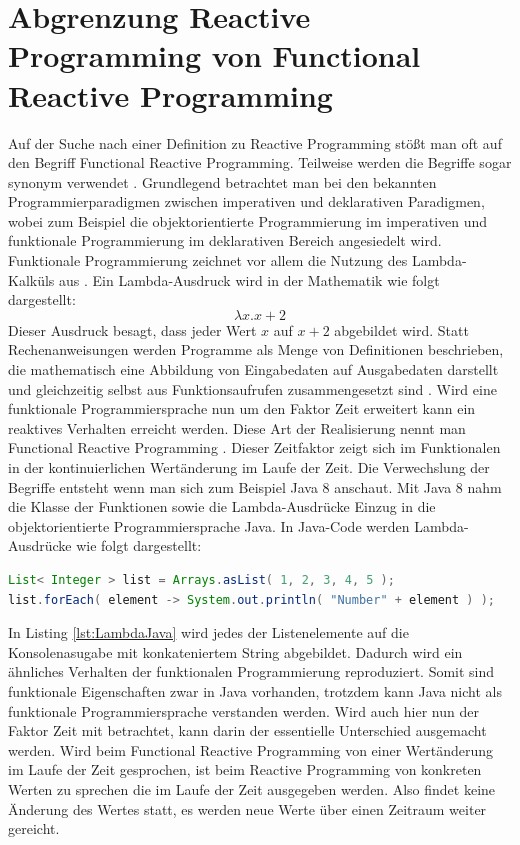 \section{Abgrenzung Reactive Programming von Functional Reactive Programming}
Auf der Suche nach einer Definition zu Reactive Programming stößt man oft auf den Begriff Functional Reactive Programming. Teilweise werden die Begriffe sogar synonym verwendet \cite{Nurkiewicz.2017}. Grundlegend betrachtet man bei den bekannten Programmierparadigmen zwischen imperativen und deklarativen Paradigmen, wobei zum Beispiel die objektorientierte Programmierung im imperativen und funktionale Programmierung im deklarativen Bereich angesiedelt wird. Funktionale Programmierung zeichnet vor allem die Nutzung des Lambda-Kalküls aus \cite{lamdakalk}. Ein Lambda-Ausdruck wird in der Mathematik wie folgt dargestellt:
\begin{displaymath}
\lambda x.x+2
\end{displaymath}
Dieser Ausdruck besagt, dass jeder Wert $x$ auf $x+2$ abgebildet wird.
Statt Rechenanweisungen werden Programme als Menge von Definitionen beschrieben, die mathematisch eine Abbildung von Eingabedaten auf Ausgabedaten darstellt und gleichzeitig selbst aus Funktionsaufrufen zusammengesetzt sind \cite{fpwiki}. Wird eine funktionale Programmiersprache nun um den Faktor Zeit erweitert kann ein reaktives Verhalten erreicht werden. Diese Art der Realisierung nennt man Functional Reactive Programming \cite{hsklwiki}. Dieser Zeitfaktor zeigt sich im Funktionalen in der kontinuierlichen Wertänderung im Laufe der Zeit. Die Verwechslung der Begriffe entsteht wenn man sich zum Beispiel Java 8 anschaut. Mit Java 8 nahm die Klasse der Funktionen sowie die Lambda-Ausdrücke Einzug in die objektorientierte Programmiersprache Java. In Java-Code werden Lambda-Ausdrücke wie folgt dargestellt:
\begin{lstlisting}[language=java, caption={Lambda Beispiel in Java}, float=hbt, label=lst:LambdaJava, frame=single]
List< Integer > list = Arrays.asList( 1, 2, 3, 4, 5 );
list.forEach( element -> System.out.println( "Number" + element ) );
\end{lstlisting}
In Listing \ref{lst:LambdaJava} wird jedes der Listenelemente auf die Konsolenasugabe mit konkateniertem String abgebildet. Dadurch wird ein ähnliches Verhalten der funktionalen Programmierung reproduziert. Somit sind funktionale Eigenschaften zwar in Java vorhanden, trotzdem kann Java nicht als funktionale Programmiersprache verstanden werden. Wird auch hier nun der Faktor Zeit mit betrachtet, kann darin der essentielle Unterschied ausgemacht werden. Wird beim Functional Reactive Programming von einer Wertänderung im Laufe der Zeit gesprochen, ist beim Reactive Programming von konkreten Werten zu sprechen die im Laufe der Zeit ausgegeben werden. Also findet keine Änderung des Wertes statt, es werden neue Werte über einen Zeitraum weiter gereicht. 
